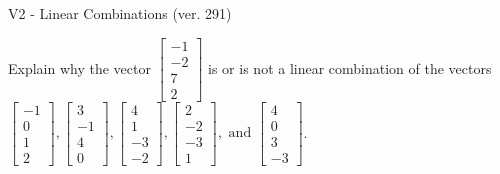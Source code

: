 \begin{exercise}
  \begin{exerciseTitle}V2 - Linear Combinations (ver. 291)\end{exerciseTitle}
  \begin{exerciseStatement}
    Explain why the vector \(\left[\begin{array}{c}
-1 \\
-2 \\
7 \\
2
\end{array}\right]\)  is or is not a linear 
	combination of the vectors \(\left[\begin{array}{c}
-1 \\
0 \\
1 \\
2
\end{array}\right] , \left[\begin{array}{c}
3 \\
-1 \\
4 \\
0
\end{array}\right] , \left[\begin{array}{c}
4 \\
1 \\
-3 \\
-2
\end{array}\right] , \left[\begin{array}{c}
2 \\
-2 \\
-3 \\
1
\end{array}\right] , \text{ and } \left[\begin{array}{c}
4 \\
0 \\
3 \\
-3
\end{array}\right]\).
	



\end{exerciseStatement}
\end{exercise}

